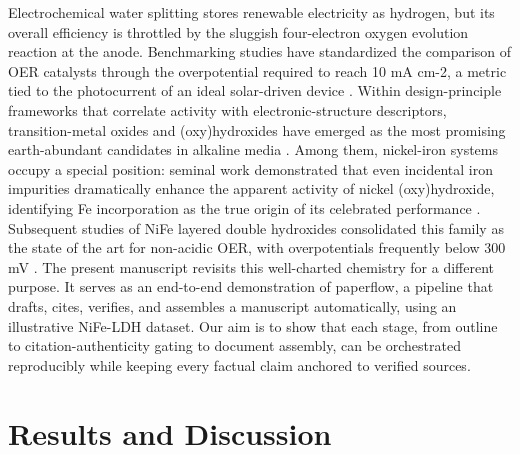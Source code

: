 \documentclass[11pt,a4paper]{article}
\begin{document}
Electrochemical water splitting stores renewable electricity as hydrogen, but its overall efficiency is throttled by the sluggish four-electron oxygen evolution reaction at the anode. Benchmarking studies have standardized the comparison of OER catalysts through the overpotential required to reach 10 mA cm-2, a metric tied to the photocurrent of an ideal solar-driven device \citep{mccrory2013}. Within design-principle frameworks that correlate activity with electronic-structure descriptors, transition-metal oxides and (oxy)hydroxides have emerged as the most promising earth-abundant candidates in alkaline media \citep{suntivich2011,grimaud2013}. Among them, nickel-iron systems occupy a special position: seminal work demonstrated that even incidental iron impurities dramatically enhance the apparent activity of nickel (oxy)hydroxide, identifying Fe incorporation as the true origin of its celebrated performance \citep{trotochaud2014}. Subsequent studies of NiFe layered double hydroxides consolidated this family as the state of the art for non-acidic OER, with overpotentials frequently below 300 mV \citep{dionigi2016}. The present manuscript revisits this well-charted chemistry for a different purpose. It serves as an end-to-end demonstration of paperflow, a pipeline that drafts, cites, verifies, and assembles a manuscript automatically, using an illustrative NiFe-LDH dataset. Our aim is to show that each stage, from outline to citation-authenticity gating to document assembly, can be orchestrated reproducibly while keeping every factual claim anchored to verified sources.

\section{Results and Discussion}
\end{document}
